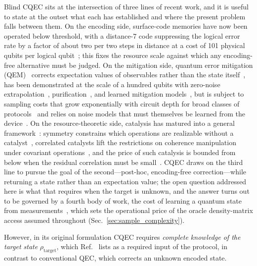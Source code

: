 \documentclass[12pt,a4paper]{article}
\newcommand{\rhot}{\rho_\mathrm{target}}
\begin{document}
Blind CQEC sits at the intersection of three lines of recent work, and it is useful to state at the outset what each has established and where the present problem falls between them.
On the encoding side, surface-code memories have now been operated below threshold, with a distance-7 code suppressing the logical error rate by a factor of about two per two steps in distance at a cost of 101 physical qubits per logical qubit~\cite{GoogleQuantumAI2025belowthreshold}; this fixes the resource scale against which any encoding-free alternative must be judged.
On the mitigation side, quantum error mitigation (QEM)~\cite{Cai2023qem} corrects expectation values of observables rather than the state itself~\cite{vandenBerg2023pec}, has been demonstrated at the scale of a hundred qubits with zero-noise extrapolation~\cite{Kim2023utility}, purification~\cite{OBrien2023purification}, and learned mitigation models~\cite{Liao2024mlqem}, but is subject to sampling costs that grow exponentially with circuit depth for broad classes of protocols~\cite{Takagi2022limits,Quek2024tighter,Tsubouchi2023costbound,Takagi2023sampling} and relies on noise models that must themselves be learned from the device~\cite{vandenBerg2023pec,Huang2023learning}.
On the resource-theoretic side, catalysis has matured into a general framework~\cite{LipkaBartosik2024catalysis,Datta2023catalysis}: symmetry constrains which operations are realizable without a catalyst~\cite{Marvian2022restrictions}, correlated catalysts lift the restrictions on coherence manipulation under covariant operations~\cite{Takagi2022correlation,Kondra2024coherence}, and the price of such catalysis is bounded from below when the residual correlation must be small~\cite{Rubboli2022limits}.
CQEC draws on the third line to pursue the goal of the second---post-hoc, encoding-free correction---while returning a state rather than an expectation value; the open question addressed here is what that requires when the target is unknown, and the answer turns out to be governed by a fourth body of work, the cost of learning a quantum state from measurements~\cite{Elben2023randomized,Anshu2024survey,Chen2023adaptivity}, which sets the operational price of the oracle density-matrix access assumed throughout (Sec.~\ref{sec:sample_complexity}).

However, in its original formulation CQEC requires \emph{complete knowledge of the target state} $\rhot$, which Ref.~\cite{Wakaura2026unified} lists as a required input of the protocol, in contrast to conventional QEC, which corrects an unknown encoded state.
\end{document}
